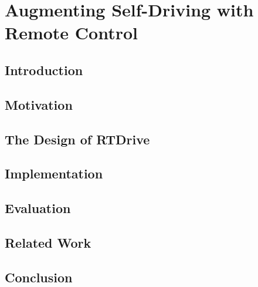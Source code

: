


\chapter{Augmenting Self-Driving with Remote Control}


\section{Introduction}




\section{Motivation}




\section{The Design of RTDrive}





\section{Implementation}





\section{Evaluation}





\section{Related Work}




\section{Conclusion}



%


